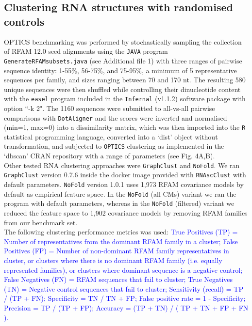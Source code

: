 \documentclass{bmcart}
\newcommand\dotaligner{\texttt{DotAligner}}
\newcommand\graphclust{\texttt{GraphClust}}
\newcommand\nofold{\texttt{NoFold}}
\begin{document}
\subsection*{Clustering RNA structures with randomised controls}
OPTICS benchmarking was performed by stochastically sampling the collection of RFAM 12.0 
seed alignments using the \texttt{JAVA} program \texttt{GenerateRFAMsubsets.java} (see Additional file 1) with three ranges of pairwise sequence identity: 1-55\%, 56-75\%, and 75-95\%, a minimum of 5 representative sequences per family, and sizes ranging between 70 and 170 nt.   
The resulting 580 unique sequences were then shuffled while controlling their dinucleotide content with 
the \texttt{easel} program included in the \texttt{Infernal} (v1.1.2) software package 
\cite{nawrocki2013infernal} with option ``-k 2". The 1160 sequences were submitted to 
all-vs-all pairwise comparisons with \dotaligner{} and the scores were inverted and 
normalised (min=1, max=0) into a dissimilarity matrix, which was then imported into
the \texttt{R} statistical programming language, converted into a `dist' object without
transformation, and subjected to \texttt{OPTICS} clustering as implemented
in the `dbscan' CRAN repository with a range of parameters (see Fig. 4A,B).\\

Other tested RNA clustering approaches were \graphclust{} and \nofold. We ran \graphclust{} version 0.7.6 inside the docker image provided with \texttt{RNAscClust} with default parameters. \nofold{} version 1.0.1 uses 1,973 RFAM covariance models by default as empirical feature space. In the \nofold{} (all CMs) variant we ran the program with default parameters, whereas in the \nofold{} (filtered) variant we reduced the feature space to 1,902 covariance models by removing RFAM families from our benchmark set. \\ 

The following clustering performance metrics was used:
\textcolor{blue}{
True Positives (TP) = Number of representatives from the dominant RFAM family in a cluster;
False Positives (FP) = Number of non-dominant RFAM family representatives in cluster, or clusters
where there is no dominant RFAM family (i.e. equally represented families), or clusters where dominant sequence is a negative control;
False Negatives (FN) = RFAM sequences that fail to cluster; 
True Negatives (TN) = Negative control sequences that fail to cluster; 
Sensitivity (recall) = TP  / (TP + FN);
Specificity  = TN / TN + FP;
False positive rate =  1 - Specificity;
Precision = TP / (TP + FP);
Accuracy = (TP + TN) / ( TP + TN + FP + FN ). 
}
\end{document}
